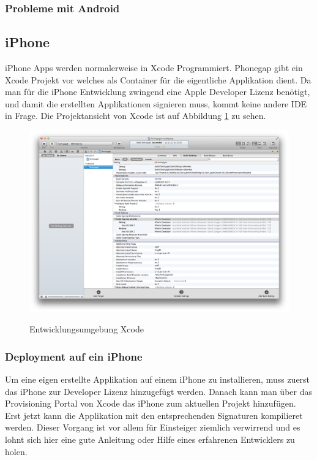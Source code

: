\subsubsection{Probleme mit Android} %
\label{ssub:probleme_mit_android}



\subsection{iPhone} %
\label{sub:iPhone}
iPhone Apps werden normalerweise in Xcode Programmiert. Phonegap gibt ein Xcode Projekt vor welches als Container für die eigentliche Applikation dient. Da man für die iPhone Entwicklung zwingend eine Apple Developer Lizenz benötigt, und damit die erstellten Applikationen signieren muss, kommt keine andere IDE in Frage. Die Projektansicht von Xcode ist auf Abbildung \ref{fig:xcode-project} zu sehen.

\begin{figure}[H]
	\centering			      
        \includegraphics[width=14cm]{images/xcode-project.png}\\
		\caption{Entwicklungsumgebung Xcode}
	\label{fig:xcode-project}
\end{figure}

\subsubsection{Deployment auf ein iPhone} %
\label{ssub:Deployment auf ein iPhone}
Um eine eigen erstellte Applikation auf einem iPhone zu installieren, muss zuerst das iPhone zur Developer Lizenz hinzugefügt werden. Danach kann man über das Provisioning Portal von Xcode das iPhone zum aktuellen Projekt hinzufügen. Erst jetzt kann die Applikation mit den entsprechenden Signaturen kompilieret werden. Dieser Vorgang ist vor allem für Einsteiger ziemlich verwirrend und es lohnt sich hier eine gute Anleitung oder Hilfe eines erfahrenen Entwicklers zu holen.

